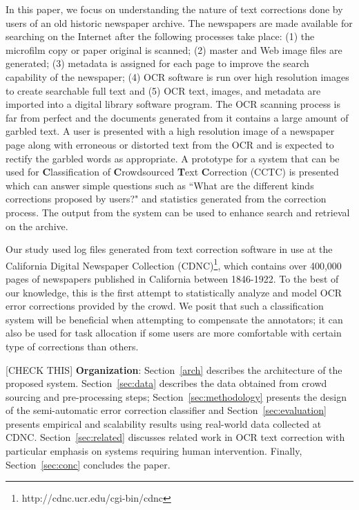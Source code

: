\documentclass[letterpaper]{article}
\begin{document}
In this paper, we focus on understanding the nature of text corrections done by users of an old historic newspaper archive. The newspapers are made available for searching on the Internet after the following processes take place: (1) the microfilm copy or paper original is scanned; (2) master and Web image files are generated; (3) metadata is assigned for each page to improve the search capability of the newspaper; (4) OCR software is run over high resolution images to create searchable full text and (5) OCR text, images, and metadata are imported into a digital library software program. The OCR scanning process is far from perfect and the documents generated from it contains a large amount of garbled text. A user is presented with a high resolution image of a newspaper page along with erroneous or distorted text from the OCR and is expected to rectify the garbled words as appropriate. A prototype for a system that can be used for \textbf{C}lassification of \textbf{C}rowdsourced \textbf{T}ext \textbf{C}orrection (CCTC) is presented which can answer simple questions such as ``What are the different kinds corrections proposed by users?" and statistics generated from the correction process. 
The output from the system can be used to enhance search and retrieval on the archive.

Our study used log files generated from text correction software in use at the California Digital Newspaper Collection (CDNC)\footnote{http://cdnc.ucr.edu/cgi-bin/cdnc}, which contains over 400,000 pages of newspapers published in California between 1846-1922. 
To the best of our knowledge, this is the first attempt to statistically analyze and model OCR error corrections provided by the crowd. We posit that such a classification system will be beneficial when attempting to compensate the annotators; it can also be used for task allocation if some users are more comfortable with certain type of corrections than others.


[CHECK THIS] \noindent \textbf{Organization}: Section~\ref{arch} describes the architecture of the proposed system. Section~\ref{sec:data} describes the data obtained from crowd sourcing and pre-processing steps; Section~\ref{sec:methodology} presents the design of the semi-automatic error correction classifier and Section~\ref{sec:evaluation} presents empirical and scalability results using real-world data collected at CDNC. Section~\ref{sec:related} discusses related work in OCR text correction with particular emphasis on systems requiring human intervention. Finally, Section~\ref{sec:conc} concludes the paper.
\end{document}
